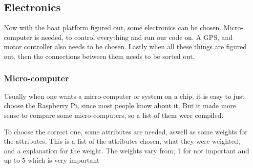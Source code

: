 \subsection{Electronics}
Now with the boat platform figured out, some electronics can be chosen. Micro-computer is needed, to control everything and run our code on. A GPS, and motor controller also needs to be chosen. Lastly when all these things are figured out, then the connections between them needs to be sorted out.

\subsubsection{Micro-computer}
Usually when one wants a micro-computer or system on a chip, it is easy to just choose the Raspberry Pi, since most people know about it. But it made more sense to compare some micro-computers, so a list of them were compiled. 

To choose the correct one, some attributes are needed, aswell as some weights for the attributes. This is a list of the attributes chosen, what they were weighted, and a explanation for the weight. The weights vary from; 1 for not important and up to 5 which is very important

